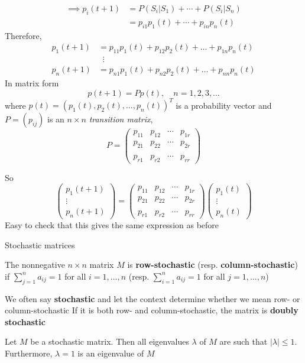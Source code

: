 \documentclass[aspectratio=169]{beamer}\usepackage[]{graphicx}\usepackage[]{xcolor}
\begin{document}
\begin{frame}
\begin{align*}
\implies
p_i(t+1) &= P(S_i|S_1)+\cdots+P(S_i|S_n) \\
&= p_{i1}p_1(t)+\cdots+p_{in}p_n(t)
\end{align*}
Therefore,
\begin{align*}
p_1(t+1) &= p_{11}p_1(t)+p_{12}p_2(t)+\dots+p_{1n}p_n(t) \\
& \;\;\vdots\\
p_n(t+1) &= p_{n1}p_1(t)+p_{n2}p_2(t)+\dots+p_{nn}p_n(t)
\end{align*}
\vfill
In matrix form
\[
p(t+1)=Pp(t), \quad n=1,2,3,\dots
\]
where $p(t)=(p_1(t),p_{2}(t),\dots , p_n(t))^T$ is a probability vector and $P=(p_{ij})$ is an $n\times n$ \emph{transition matrix},
\[
P=
\begin{pmatrix}
p_{11} & p_{12} & \cdots & p_{1r} \\
p_{21} & p_{22} & \cdots & p_{2r} \\
&&& \\
p_{r1} & p_{r2} & \cdots & p_{rr}
\end{pmatrix}
\]
\end{frame}


\begin{frame}
So
\[
\begin{pmatrix}
	p_1(t+1)\\ \vdots\\ p_n(t+1)
\end{pmatrix}
=
\begin{pmatrix}
p_{11} & p_{12} & \cdots & p_{1r} \\
p_{21} & p_{22} & \cdots & p_{2r} \\
&&& \\
p_{r1} & p_{r2} & \cdots & p_{rr}
\end{pmatrix}
\begin{pmatrix}
	p_1(t)\\ \vdots\\ p_n(t)
\end{pmatrix}
\]
\vfill
Easy to check that this gives the same expression as before
\end{frame}



\begin{frame}{Stochastic matrices}
\begin{definition}
The nonnegative $n\times n$ matrix $M$ is \textbf{row-stochastic} (resp. \textbf{column-stochastic}) if $\sum_{j=1}^na_{ij}=1$ for all $i=1,\dots,n$ (resp. $\sum_{i=1}^na_{ij}=1$ for all $j=1,\dots,n$)
\end{definition}
\vfill
We often say \textbf{stochastic} and let the context determine whether we mean row- or column-stochastic
\vfill
If it is both row- and column-stochastic, the matrix is \textbf{doubly stochastic}
\vfill
\begin{theorem}\label{th:spectrum_stochastic_matrix}
Let $M$ be a stochastic matrix. Then all eigenvalues $\lambda$ of $M$ are such that $|\lambda|\leq 1$. 
Furthermore, $\lambda =1$ is an eigenvalue of $M$
\end{theorem}
\end{frame}
\end{document}
